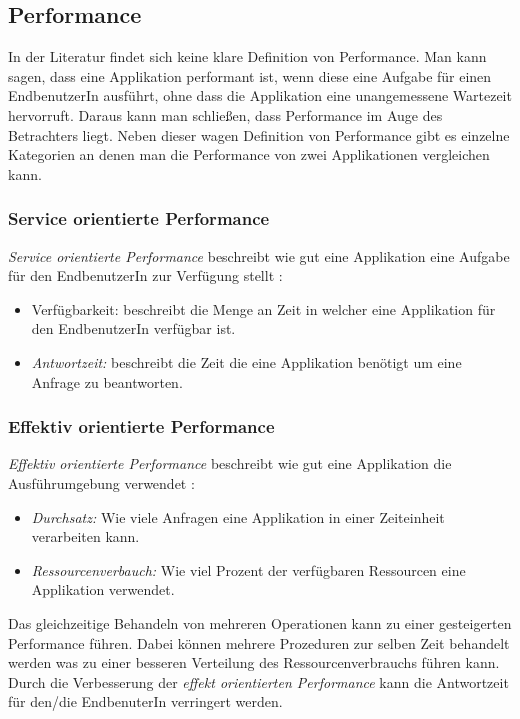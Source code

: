 \subsection{Performance}

In der Literatur findet sich keine klare Definition von Performance. Man kann sagen, dass eine Applikation performant ist, wenn diese eine Aufgabe für einen EndbenutzerIn ausführt, ohne dass die Applikation eine unangemessene Wartezeit hervorruft. Daraus kann man schließen, dass Performance im Auge des Betrachters liegt. Neben dieser wagen Definition von Performance gibt es einzelne Kategorien an denen man die Performance von zwei Applikationen vergleichen kann\cite[p. 2]{Mol2009}. 

\subsubsection{Service orientierte Performance}

\emph{Service orientierte Performance} beschreibt wie gut eine Applikation eine Aufgabe für den EndbenutzerIn zur Verfügung stellt \cite[p. 2]{Mol2009}:

\begin{itemize}
  \item {Verfügbarkeit:} beschreibt die Menge an Zeit in welcher eine Applikation für den EndbenutzerIn verfügbar ist.
  \item \emph{Antwortzeit:} beschreibt die Zeit die eine Applikation benötigt um eine Anfrage zu beantworten.
\end{itemize}


\subsubsection{Effektiv orientierte Performance}

\emph{Effektiv orientierte Performance} beschreibt wie gut eine Applikation die Ausführumgebung verwendet \cite[p. 2]{Mol2009}:

\begin{itemize}
  \item \emph{Durchsatz:} Wie viele Anfragen eine Applikation in einer Zeiteinheit verarbeiten kann.
  \item \emph{Ressourcenverbauch:} Wie viel Prozent der verfügbaren Ressourcen eine Applikation verwendet.
\end{itemize}

Das gleichzeitige Behandeln von mehreren Operationen kann zu einer gesteigerten Performance führen. Dabei können mehrere Prozeduren zur selben Zeit behandelt werden was zu einer besseren Verteilung des Ressourcenverbrauchs führen kann. Durch die Verbesserung der \emph{effekt orientierten Performance} kann die Antwortzeit für den/die EndbenuterIn verringert werden.

